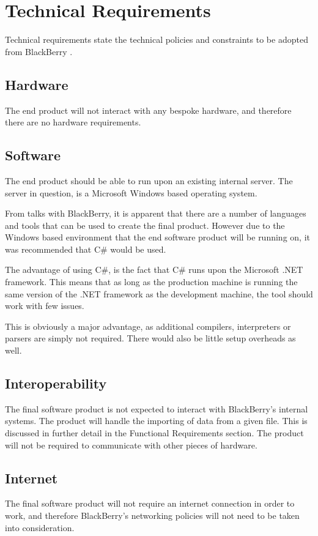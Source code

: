 \section{Technical Requirements}
Technical requirements state the technical policies and constraints to be 
adopted from BlackBerry \citep{cadle10}.

\subsection{Hardware}
The end product will not interact with any bespoke hardware, and therefore there 
are no hardware requirements.

\subsection{Software}
The end product should be able to run upon an existing internal server. The 
server in question, is a Microsoft Windows based operating system.

From talks with BlackBerry, it is apparent that there are a number of languages 
and tools that can be used to create the final product. However due to the 
Windows based environment that the end software product will be running on, it
was recommended that C\# would be used.

The advantage of using C\#, is the fact that C\# runs upon the Microsoft .NET 
framework. This means that as long as the production machine is running the 
same version of the .NET framework as the development machine, the tool should 
work with few issues. 

This is obviously a major advantage, as additional compilers, interpreters or 
parsers are simply not required. There would also be little setup overheads as
well.

\subsection{Interoperability}
The final software product is not expected to interact with BlackBerry's 
internal systems. The product will handle the importing of data from a given 
file. This is discussed in further detail in the Functional Requirements 
section. The product will not be required to communicate with other pieces of 
hardware.

\subsection{Internet}
The final software product will not require an internet connection in order to
work, and therefore BlackBerry's networking policies will not need to be taken
into consideration.